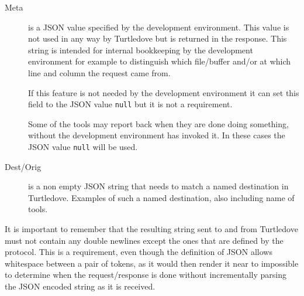 \begin{description}
\item[Meta] is a JSON value specified by the development environment. This value
  is not used in any way by Turtledove but is returned in the response. This
  string is intended for internal bookkeeping by the development environment for
  example to distinguish which file/buffer and/or at which line and column the
  request came from.

  If this feature is not needed by the development environment it can set this
  field to the JSON value \texttt{null} but it is not a requirement.

  Some of the tools may report back when they are done doing something, without
  the development environment has invoked it. In these cases the JSON value
  \texttt{null} will be used.

\item[Dest/Orig] is a non empty JSON string that needs to match a named destination in
  Turtledove. Examples of such a named destination, also including name of
  tools.
\end{description}


It is important to remember that the resulting string sent to and from
Turtledove must not contain any double newlines except the ones that are defined by
the protocol. This is a requirement, even though the definition of JSON allows
whitespace between a pair of tokens, as it would then render it near to
impossible to determine when the request/response is done without incrementally
parsing the JSON encoded string as it is received.

